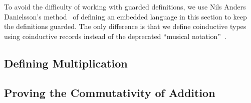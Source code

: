 To avoid the difficulty of working with guarded definitions, we use Nils Anders
Danielsson's method~\cite{danielsson-beating} of defining an embedded language
in this section to keep the definitions guarded. The only difference is that we
define coinductive types using coinductive records instead of the deprecated
``musical notation''~\cite{agda-coinduction}.

\subsection{Defining Multiplication}\label{sec:dsl-mul}


\subsection{Proving the Commutativity of Addition}\label{sec:dsl-comm}


